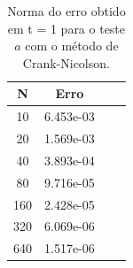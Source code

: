 \documentclass[a4paper, 12pt]{article}
\begin{document}
\begin{table}[!h]
    \centering
    \begin{tabular}{|c|c|c|c|}
    \hline                               %
    N & Erro \\
    \hline
    10  & 6.453e-03  \\
    20  & 1.569e-03  \\
    40  & 3.893e-04  \\
    80  & 9.716e-05  \\
    160 & 2.428e-05  \\
    320 & 6.069e-06  \\
    640 & 1.517e-06  \\
    \hline
    \end{tabular}
    \caption{Norma do erro obtido em t = 1 para o teste $a$ com o método de Crank-Nicolson.}
\end{table}
\end{document}
